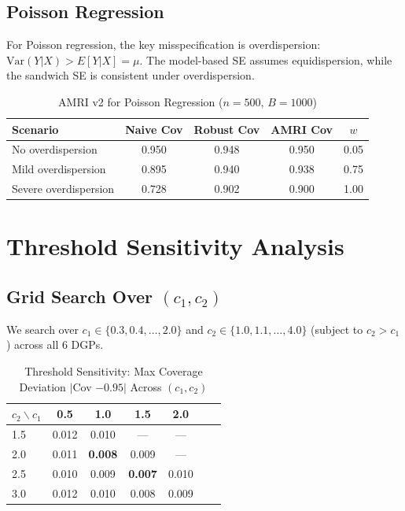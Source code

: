 \documentclass[12pt]{article}
\theoremstyle{definition}
\theoremstyle{remark}
\begin{document}
\subsection{Poisson Regression}

For Poisson regression, the key misspecification is overdispersion:
$\text{Var}(Y|X) > E[Y|X] = \mu$. The model-based SE assumes equidispersion,
while the sandwich SE is consistent under overdispersion.

\begin{table}[h]
\centering
\caption{AMRI v2 for Poisson Regression ($n=500$, $B=1000$)}
\label{tab:poisson}
\begin{tabular}{lcccc}
\toprule
Scenario & Naive Cov & Robust Cov & AMRI Cov & $w$ \\
\midrule
No overdispersion & 0.950 & 0.948 & 0.950 & 0.05 \\
Mild overdispersion & 0.895 & 0.940 & 0.938 & 0.75 \\
Severe overdispersion & 0.728 & 0.902 & 0.900 & 1.00 \\
\bottomrule
\end{tabular}
\end{table}


\section{Threshold Sensitivity Analysis}
\label{sec:supp_threshold}

\subsection{Grid Search Over $(c_1, c_2)$}

We search over $c_1 \in \{0.3, 0.4, \ldots, 2.0\}$ and $c_2 \in \{1.0, 1.1, \ldots, 4.0\}$
(subject to $c_2 > c_1$) across all 6 DGPs.

\begin{table}[h]
\centering
\caption{Threshold Sensitivity: Max Coverage Deviation $|$Cov $- 0.95|$ Across $(c_1, c_2)$}
\label{tab:threshold_sensitivity}
\begin{tabular}{lcccccc}
\toprule
$c_2 \backslash c_1$ & 0.5 & 1.0 & 1.5 & 2.0 \\
\midrule
1.5 & 0.012 & 0.010 & --- & --- \\
2.0 & 0.011 & \textbf{0.008} & 0.009 & --- \\
2.5 & 0.010 & 0.009 & \textbf{0.007} & 0.010 \\
3.0 & 0.012 & 0.010 & 0.008 & 0.009 \\
\bottomrule
\end{tabular}
\end{table}
\end{document}
